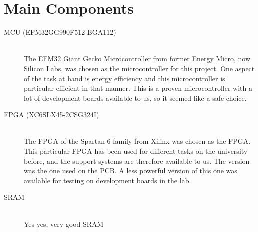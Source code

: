 \documentclass[../main/report.tex]{subfiles}
\begin{document}
\section{Main Components}


\begin{description}

    \item[MCU (EFM32GG990F512-BGA112)] \hfill \\
    The EFM32 Giant Gecko Microcontroller from former Energy Micro, now Silicon Labs, was chosen as the microcontroller for this project.
    One aspect of the task at hand is energy efficiency and this microcontroller is particular efficient in that manner.
    This is a proven microcontroller with a lot of development boards available to us, so it seemed like a safe choice.

    \item[FPGA (XC6SLX45-2CSG324I)] \hfill \\
    The  FPGA of the Spartan-6 family from Xilinx was chosen as the FPGA.
    This particular FPGA has been used for different tasks on the university before, and the support systems are therefore available to us.
    The version was the one used on the PCB.
    A less powerful version of this one was available for testing on development boards in the lab.


    \item[SRAM] \hfill \\
    Yes yes, very good SRAM 

\end{description}
\end{document}
